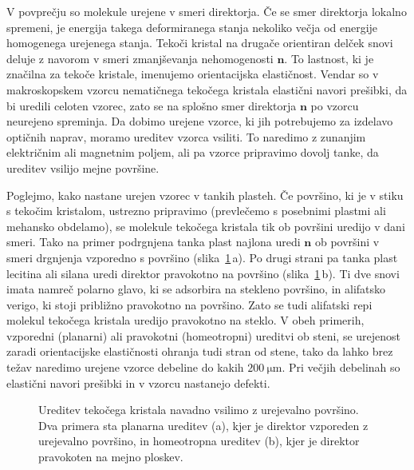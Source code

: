 V povprečju so molekule urejene v smeri direktorja. Če se smer direktorja lokalno
spremeni, je energija takega deformiranega 
stanja nekoliko večja od energije homogenega urejenega stanja. Tekoči kristal na
drugače orientiran delček snovi deluje z navorom v smeri zmanjševanja 
nehomogenosti $\mathbf{n}$. To lastnost, ki je značilna za tekoče kristale,
imenujemo orientacijska elastičnost. Vendar so v makroskopskem vzorcu
nematičnega tekočega kristala elastični navori prešibki,
da bi uredili celoten vzorec, zato se na splošno smer direktorja $\mathbf{n}$ 
po vzorcu neurejeno spreminja. Da dobimo urejene vzorce, ki jih potrebujemo za izdelavo
optičnih naprav, moramo ureditev vzorca 
vsiliti. To naredimo z zunanjim električnim ali magnetnim poljem, 
ali pa vzorce pripravimo dovolj tanke, da ureditev vsilijo mejne površine. 

Poglejmo, kako nastane urejen vzorec v tankih plasteh. Če površino,
ki je v stiku s tekočim kristalom, ustrezno pripravimo (prevlečemo s posebnimi 
plastmi ali mehansko obdelamo), se molekule tekočega kristala tik ob površini uredijo
v dani smeri. Tako na primer podrgnjena tanka plast najlona uredi
$\mathbf{n}$ ob površini v smeri drgnjenja vzporedno s površino (slika~\ref{s7.20a}\,a). 
Po drugi strani pa tanka plast lecitina ali silana uredi direktor 
pravokotno na površino (slika~\ref{s7.20a}\,b). Ti dve snovi imata namreč
polarno glavo, ki se adsorbira na stekleno površino, in alifatsko verigo, 
ki stoji približno pravokotno na površino. Zato se tudi alifatski repi molekul
tekočega kristala uredijo pravokotno na steklo. V obeh primerih, 
vzporedni (planarni) ali pravokotni (homeotropni) ureditvi ob steni, 
se urejenost zaradi orientacijske elastičnosti
ohranja tudi stran od stene, tako da lahko brez težav naredimo urejene
vzorce debeline do kakih $200~\si{\micro\metre}$. Pri večjih debelinah so elastični
navori prešibki in v vzorcu nastanejo defekti.
\begin{figure}[h]
\centering
\def\svgwidth{120truemm} 

\caption{Ureditev tekočega kristala navadno vsilimo z urejevalno površino. Dva primera
sta planarna ureditev (a), kjer je direktor vzporeden z urejevalno površino, in 
homeotropna ureditev (b), kjer je direktor pravokoten na mejno ploskev.}
\label{s7.20a}
\end{figure}
 
